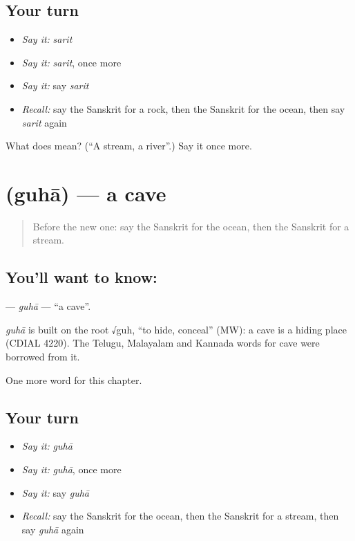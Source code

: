 \subsection*{Your turn}
\begin{itemize}
\raggedright
  \item \emph{Say it:} \emph{sarit}
  \item \emph{Say it:} \emph{sarit}, once more
  \item \emph{Say it:} say \emph{sarit}
  \item \emph{Recall:} say the Sanskrit for a rock, then the Sanskrit for the ocean, then say \emph{sarit} again
\end{itemize}

\begin{tcolorbox}[breakable,colback=teal!4,colframe=teal!35!black,title={Before you move on}]
What does  mean? (\textquotedblleft{}A stream, a river\textquotedblright{}.) Say it once more.
\end{tcolorbox}
\section[\texorpdfstring{\sk{गुहा} (guhā)}{गुहा (guhā)}]{ (guhā) — a cave}

\label{lesson:SA-C196-guha}



\begin{quote}
Before the new one: say the Sanskrit for the ocean, then the Sanskrit for a stream.
\end{quote}

\subsection*{You'll want to know: }
\textbf{} — \emph{guhā} — \textquotedblleft{}a cave\textquotedblright{}.

\begin{cousinweb}
\emph{guhā} is built on the root √guh, \textquotedblleft{}to hide, conceal\textquotedblright{} (MW): a cave is a hiding place (CDIAL 4220). The Telugu, Malayalam and Kannada words for cave were borrowed from it.
\end{cousinweb}

\begin{grammarlens}[title={What you've built}]
One more word for this chapter.
\end{grammarlens}

\subsection*{Your turn}
\begin{itemize}
\raggedright
  \item \emph{Say it:} \emph{guhā}
  \item \emph{Say it:} \emph{guhā}, once more
  \item \emph{Say it:} say \emph{guhā}
  \item \emph{Recall:} say the Sanskrit for the ocean, then the Sanskrit for a stream, then say \emph{guhā} again
\end{itemize}

